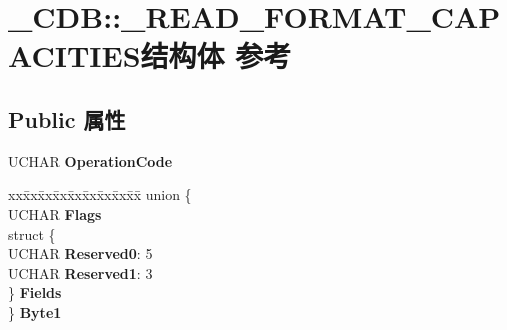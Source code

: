 \hypertarget{struct___c_d_b_1_1___r_e_a_d___f_o_r_m_a_t___c_a_p_a_c_i_t_i_e_s}{}\section{\+\_\+\+C\+DB\+:\+:\+\_\+\+R\+E\+A\+D\+\_\+\+F\+O\+R\+M\+A\+T\+\_\+\+C\+A\+P\+A\+C\+I\+T\+I\+E\+S结构体 参考}
\label{struct___c_d_b_1_1___r_e_a_d___f_o_r_m_a_t___c_a_p_a_c_i_t_i_e_s}
\subsection*{Public 属性}
\begin{DoxyCompactItemize}
\item 
\mbox{\label{struct___c_d_b_1_1___r_e_a_d___f_o_r_m_a_t___c_a_p_a_c_i_t_i_e_s_a7b5768eea38177f593cdc1bcfa071a2f}} 
U\+C\+H\+AR {\bfseries Operation\+Code}
\item 
\mbox{\label{struct___c_d_b_1_1___r_e_a_d___f_o_r_m_a_t___c_a_p_a_c_i_t_i_e_s_aa103e3ab5b5f560b210e8f07f345ce08}} 
\begin{tabbing}
xx\=xx\=xx\=xx\=xx\=xx\=xx\=xx\=xx\=\kill
union \{\\
\>UCHAR {\bfseries Flags}\\
\>struct \{\\
\>\>UCHAR {\bfseries Reserved0}: 5\\
\>\>UCHAR {\bfseries Reserved1}: 3\\
\>\} {\bfseries Fields}\\
\} {\bfseries Byte1}\\


\end{tabbing}
\end{DoxyCompactItemize}
